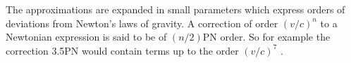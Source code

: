 \documentclass[english, oneside]{HYgradu}
\begin{document}
%
%
%
%
The approximations are expanded in small parameters which express orders of deviations from Newton's laws of gravity. A correction of order $(v/c)^n$ to a Newtonian expression is said to be of $(n/2)\mathrm{PN}$ order. So for example the correction 3.5PN would contain terms up to the order $(v/c)^7$ \citep{will:2006}.
\end{document}
